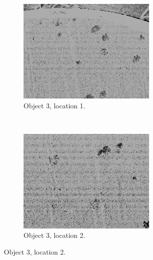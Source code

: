 \documentclass[10pt]{IEEEtran}
\begin{document}
\begin{center}
\begin{figure}[!hbt]
    \begin{subfigure}[!hbt]{0.25\textwidth}
        \includegraphics[width=\textwidth]{Object3_1}
        \caption{Object 3, location 1.}
        \label{fig:Object3_1}
    \end{subfigure}\quad
    ~ %
    \begin{subfigure}[!hbt]{0.25\textwidth}
        \includegraphics[width=\textwidth]{Object3_2}
        \caption{Object 3, location 2.}
        \label{fig:Object3_2}
    \end{subfigure}\hfill

\end{figure}
\end{center}
\end{document}
